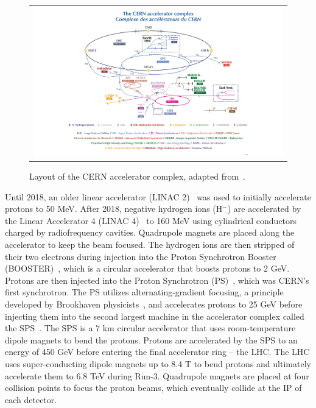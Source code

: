 \begin{figure}[tbh!]
 \begin{center}
 \begin{tabular}{c}
 \includegraphics[width=\textwidth]{figures/Part2/LHC/CERN}
 \end{tabular}
 \caption{Layout of the \ac{CERN} accelerator complex, adapted from~\cite{CERN:2022}.}
 \label{fig:LHC}
 \end{center}
\end{figure}

Until 2018, an older linear accelerator (LINAC 2)~\cite{Boltezar:1979ba} was used to initially accelerate protons to 50 MeV. After 2018, negative hydrogen ions (H$^{-}$) are accelerated by the Linear Accelerator 4 (LINAC 4)~\cite{Vretenar:2020quc} to 160 MeV using cylindrical conductors charged by radiofrequency cavities. Quadrupole magnets are placed along the accelerator to keep the beam focused. The hydrogen ions are then stripped of their two electrons during injection into the Proton Synchrotron Booster (BOOSTER)~\cite{Reich:1969fw}, which is a circular accelerator that boosts protons to 2 GeV. Protons are then injected into the Proton Synchrotron (PS)~\cite{PS:1953}, which was \ac{CERN}'s first synchrotron. The PS utilizes alternating-gradient focusing, a principle developed by Brookhaven physicists~\cite{Courant:1952rn,PhysRev.88.1197}, and accelerates protons to 25 GeV before injecting them into the second largest machine in the accelerator complex called the \ac{SPS}~\cite{Adams:1970en}. The \ac{SPS} is a 7 km circular accelerator that uses room-temperature dipole magnets to bend the protons. Protons are accelerated by the \ac{SPS} to an energy of 450 GeV before entering the final accelerator ring -- the \ac{LHC}. The \ac{LHC} uses super-conducting dipole magnets up to 8.4 T to bend protons and ultimately accelerate them to 6.8 TeV during Run-3. Quadrupole magnets are placed at four collision points to focus the proton beams, which eventually collide at the \ac{IP} of each detector. 

